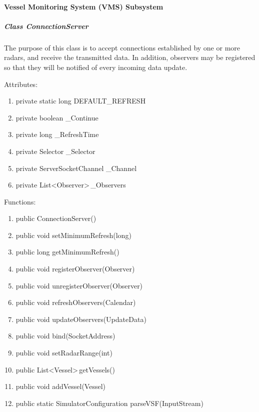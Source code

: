 \documentclass{article}
\begin{document}
\paragraph{Vessel Monitoring System (VMS) Subsystem}

\subparagraph{Class ConnectionServer}
The purpose of this class is to accept connections established by one or more radars, and receive the transmitted data. In addition, observers may be registered so that they will be notified of every incoming data update.

\vspace{0.5cm}

Attributes:
\begin{enumerate}
	\item private static long DEFAULT\_REFRESH
    \item private boolean \_Continue
    \item private long \_RefreshTime
    \item private Selector \_Selector
    \item private ServerSocketChannel \_Channel
    \item private List\textless Observer\textgreater \,\_Observers
\end {enumerate}

\vspace{0.5cm}

Functions:
\begin{enumerate}
	\item public ConnectionServer()
	\item public void setMinimumRefresh(long)
	\item public long getMinimumRefresh()
	\item public void registerObserver(Observer)
	\item public void unregisterObserver(Observer)
	\item public void refreshObservers(Calendar)
	\item public void updateObservers(UpdateData)
	\item public void bind(SocketAddress)
	\item public void setRadarRange(int)
	\item public List\textless Vessel\textgreater \,getVessels()
	\item public void addVessel(Vessel)
	\item public static SimulatorConfiguration parseVSF(InputStream)
\end{enumerate}
\end{document}
